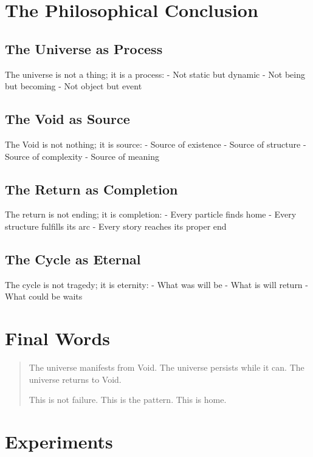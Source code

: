 \documentclass[
  11pt,
  letterpaper,
  twoside,
  openright]{book}
\begin{document}
\section{The Philosophical
Conclusion}\label{the-philosophical-conclusion}

\subsection{The Universe as Process}\label{the-universe-as-process}

The universe is not a thing; it is a process: - Not static but dynamic -
Not being but becoming - Not object but event

\subsection{The Void as Source}\label{the-void-as-source}

The Void is not nothing; it is source: - Source of existence - Source of
structure - Source of complexity - Source of meaning

\subsection{The Return as Completion}\label{the-return-as-completion}

The return is not ending; it is completion: - Every particle finds home
- Every structure fulfills its arc - Every story reaches its proper end

\subsection{The Cycle as Eternal}\label{the-cycle-as-eternal}

The cycle is not tragedy; it is eternity: - What was will be - What is
will return - What could be waits

\section{Final Words}\label{final-words}

\begin{quote}
The universe manifests from Void. The universe persists while it can.
The universe returns to Void.

This is not failure. This is the pattern. This is home.
\end{quote}

\section{Experiments}\label{experiments-43}
\end{document}
